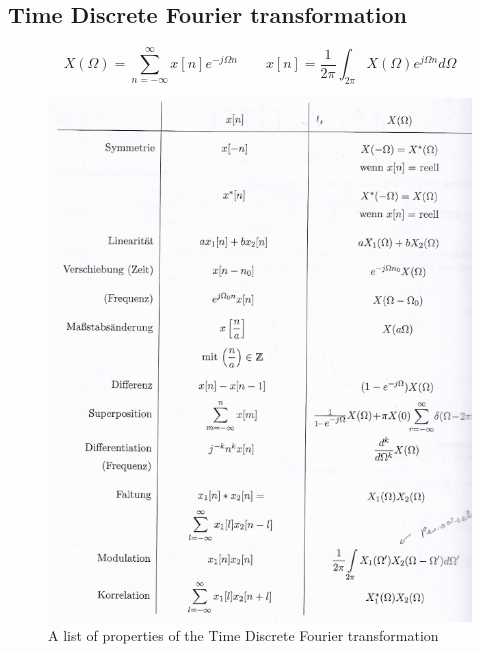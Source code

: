 \documentclass[10pt,a4paper]{article}
\begin{document}
\subsection{Time Discrete Fourier transformation}
$$
X(\Omega) = \sum_{n=-\infty}^{\infty} x[n] e^{-j \Omega n} \qquad
x[n] = \frac{1}{2\pi} \int_{2\pi} X(\Omega)e^{j \Omega n} d\Omega
$$
\begin{figure}[H]
\centering
\includegraphics[scale=1]{2FourierDiscreteProperties.PNG}
\caption{A list of properties of the Time Discrete Fourier transformation}
\label{FourierContProperties}
\end{figure}
\end{document}

